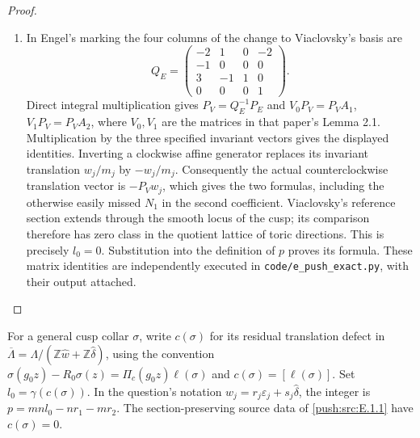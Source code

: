 \begin{proof}
\begin{enumerate}[label=\arabic*.,leftmargin=*]
\item In Engel's marking the four columns of the change to Viaclovsky's
basis are
\[
 Q_E=\begin{pmatrix}-2&1&0&-2\\-1&0&0&0\\3&-1&1&0\\0&0&0&1\end{pmatrix}.
\]
Direct integral multiplication gives $P_V=Q_E^{-1}P_E$ and
$V_0P_V=P_VA_1$, $V_1P_V=P_VA_2$, where $V_0,V_1$ are the
matrices in that paper's Lemma 2.1.  Multiplication by the three
specified invariant vectors gives the displayed identities.
Inverting a clockwise affine generator replaces its invariant
translation $w_j/m_j$ by $-w_j/m_j$.  Consequently the actual
counterclockwise translation vector is $-P_Vw_j$, which gives the
two formulas, including the otherwise easily missed $N_1$ in the
second coefficient.  Viaclovsky's reference section extends through
the smooth locus of the cusp; its comparison therefore has zero
class in the quotient lattice of toric directions.  This is precisely
$l_0=0$.  Substitution into the definition of $p$ proves its formula.
These matrix identities are independently executed in
\texttt{code/e\_push\_exact.py}, with their output attached.
\end{enumerate}
\end{proof}

For a general cusp collar $\sigma$, write $c(\sigma)$ for
its residual translation defect in
$\overline\Lambda=\Lambda/(\mathbb Z\widehat w+
\mathbb Z\widehat\delta)$, using the convention
$\sigma(g_0z)-R_0\sigma(z)=\Pi_c(g_0z)\ell(\sigma)$
and $c(\sigma)=[\ell(\sigma)]$.
Set $l_0=\gamma(c(\sigma))$.  In the question's notation
$w_j=r_j\varepsilon_j+s_j\widehat\delta$, the integer is
$p=mn l_0-nr_1-mr_2$.
The section-preserving source data of \ref{push:src:E.1.1} have $c(\sigma)=0$.

